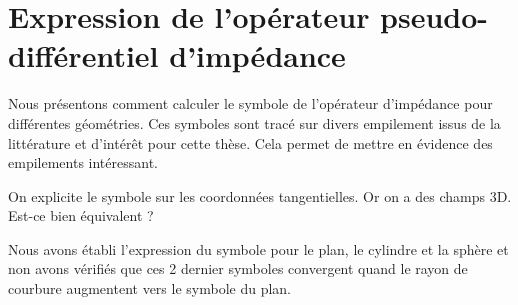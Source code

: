 \chapter{Expression de l'opérateur pseudo-différentiel d'impédance}
\minitoc
\newpage
{}
Nous présentons comment calculer le symbole de l'opérateur d'impédance pour différentes géométries. Ces symboles sont tracé sur divers empilement issus de la littérature et d’intérêt pour cette thèse. Cela permet de mettre en évidence des empilements intéressant.
\begin{TODO}
    On explicite le symbole sur les coordonnées tangentielles. Or on a des champs 3D. Est-ce bien équivalent ?
\end{TODO}




Nous avons établi l'expression du symbole pour le plan, le cylindre et la sphère et non avons vérifiés que ces 2 dernier symboles convergent quand le rayon de courbure augmentent vers le symbole du plan.